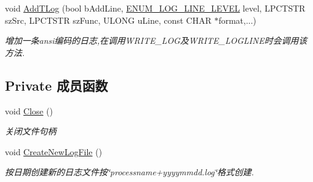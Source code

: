 \begin{DoxyCompactItemize}
void \hyperlink{classcommon_1_1_c_text_log_ac795cde93dff7db43cb22ce9d351071f}{Add\+T\+Log} (bool b\+Add\+Line, \hyperlink{namespacecommon_af715c011984b434cbb7f04b0d4e57589}{E\+N\+U\+M\+\_\+\+L\+O\+G\+\_\+\+L\+I\+N\+E\+\_\+\+L\+E\+V\+E\+L} level, L\+P\+C\+T\+S\+T\+R sz\+Src, L\+P\+C\+T\+S\+T\+R sz\+Func, U\+L\+O\+N\+G u\+Line, const C\+H\+A\+R $\ast$format,...)
\begin{DoxyCompactList}\small\item\em 增加一条ansi编码的日志,在调用\+W\+R\+I\+T\+E\+\_\+\+L\+O\+G及\+W\+R\+I\+T\+E\+\_\+\+L\+O\+G\+L\+I\+N\+E时会调用该方法. \end{DoxyCompactList}\end{DoxyCompactItemize}
\subsection*{Private 成员函数}
\begin{DoxyCompactItemize}
\item 
void \hyperlink{classcommon_1_1_c_text_log_a5cad31ca8ab60776c16ec4ab0a1f0165}{Close} ()
\begin{DoxyCompactList}\small\item\em 关闭文件句柄 \end{DoxyCompactList}\item 
void \hyperlink{classcommon_1_1_c_text_log_afcda3237d33ad68a499523ed202634e7}{Create\+New\+Log\+File} ()
\begin{DoxyCompactList}\small\item\em 按日期创建新的日志文件按\char`\"{}processname+yyyymmdd.\+log\char`\"{}格式创建. \end{DoxyCompactList}\end{DoxyCompactItemize}
